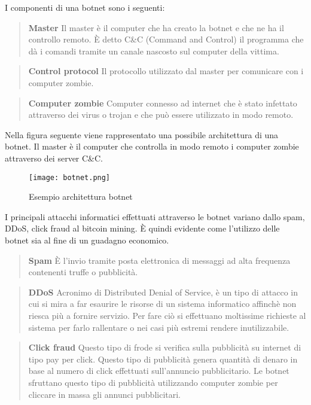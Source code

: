 \documentclass[../main.tex]{subfiles}
\begin{document}
I componenti di una botnet sono i seguenti:

\begin{verse}
				\textbf{Master} Il master è il computer che ha creato la botnet e che ne ha il controllo remoto. È detto C\&C (Command and Control) il programma che dà i comandi tramite un canale nascosto sul computer della vittima.
\end{verse}

\begin{verse}
				\textbf{Control protocol} Il protocollo utilizzato dal master per comunicare con i computer zombie.
\end{verse}

\begin{verse}
				\textbf{Computer zombie} Computer connesso ad internet che è stato infettato attraverso dei virus o trojan e che può essere utilizzato in modo remoto. 
\end{verse}

Nella figura seguente viene rappresentato una possibile architettura di una botnet. Il master è il computer che controlla in modo remoto i computer zombie attraverso dei server C\&C.
\begin{figure}[H]
				\centering
				\texttt{[image: botnet.png]}
				\caption{Esempio architettura botnet}
\end{figure}

I principali attacchi informatici effettuati attraverso le botnet variano dallo spam, DDoS, click fraud al bitcoin mining. È quindi evidente come l'utilizzo delle botnet sia al fine di un guadagno economico.

\begin{verse}
				\textbf{Spam} È l'invio tramite posta elettronica di messaggi ad alta frequenza contenenti truffe o pubblicità.
\end{verse}

\begin{verse}
				\textbf{DDoS} Acronimo di Distributed Denial of Service, è un tipo di attacco in cui si mira a far esaurire le risorse di un sistema informatico affinchè non riesca più a fornire servizio. Per fare ciò si effettuano moltissime richieste al sistema per farlo rallentare o nei casi più estremi rendere inutilizzabile.
\end{verse}

\begin{verse}
				\textbf{Click fraud} Questo tipo di frode si verifica sulla pubblicità su internet di tipo pay per click. Questo tipo di pubblicità genera quantità di denaro in base al numero di click effettuati sull'annuncio pubblicitario. Le botnet sfruttano questo tipo di pubblicità utilizzando computer zombie per cliccare in massa gli annunci pubblicitari.
\end{verse}
\end{document}

